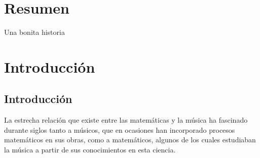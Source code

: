 \documentclass[a4paper, openright, 11pt, titlepage]{report}
\theoremstyle{definition}\newtheorem{defin}[propo]{Definition}
\theoremstyle{definition}\newtheorem{obser}[propo]{Remark}
\theoremstyle{definition}\newtheorem{ejem}[propo]{Ejemplo}
\theoremstyle{definition}\newtheorem{algoritmo}[propo]{Algoritmo}
\begin{document}
\chapter*{Resumen} %

Una bonita historia
\tableofcontents %

\cleardoublepage
{} %
\listoffigures %

\cleardoublepage
{} %
\listoftables %
\newpage
\chapter{Introducción}
\section{Introducción}

La estrecha relación que existe entre las matemáticas y la música ha fascinado durante siglos tanto a músicos, que en ocasiones han incorporado procesos matemáticos en sus obras, como a matemáticos, algunos de los cuales estudiaban la música a partir de sus conocimientos en esta ciencia.\\
\end{document}
